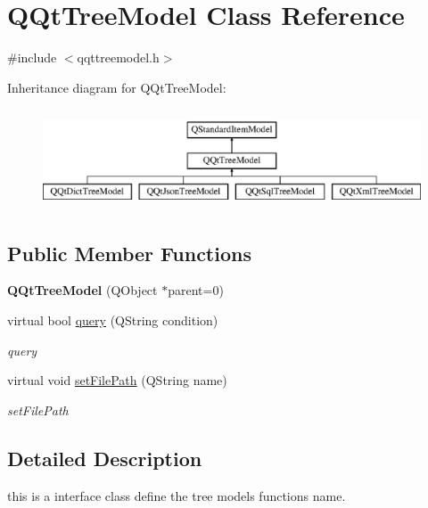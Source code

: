 \hypertarget{class_q_qt_tree_model}{}\section{Q\+Qt\+Tree\+Model Class Reference}
\label{class_q_qt_tree_model}


{\ttfamily \#include $<$qqttreemodel.\+h$>$}

Inheritance diagram for Q\+Qt\+Tree\+Model\+:\begin{figure}[H]
\begin{center}
\leavevmode
\includegraphics[height=3.000000cm]{class_q_qt_tree_model}
\end{center}
\end{figure}
\subsection*{Public Member Functions}
\begin{DoxyCompactItemize}
\item 
\mbox{\label{class_q_qt_tree_model_aeee86f063c41860bd235ad84cfc6b77d}} 
{\bfseries Q\+Qt\+Tree\+Model} (Q\+Object $\ast$parent=0)
\item 
virtual bool \mbox{\hyperlink{class_q_qt_tree_model_aacd492ce920be939d95d7e1bc2978cb1}{query}} (Q\+String condition)
\begin{DoxyCompactList}\small\item\em query \end{DoxyCompactList}\item 
virtual void \mbox{\hyperlink{class_q_qt_tree_model_acfeea0d58fa29b1c34c1491f6a8f0b7c}{set\+File\+Path}} (Q\+String name)
\begin{DoxyCompactList}\small\item\em set\+File\+Path \end{DoxyCompactList}\end{DoxyCompactItemize}


\subsection{Detailed Description}
this is a interface class define the tree model\textquotesingle{}s functions name. 

